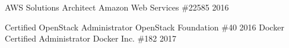 

\begin{cvhonors}

  \cvhonor
    {AWS Solutions Architect}
    {Amazon Web Services}
    {\#22585}
    {2016} %

  \cvhonor
    {Certified OpenStack Administrator}
    {OpenStack Foundation}
    {\#40}
    {2016} %
  \cvhonor
    {Docker Certified Administrator}
    {Docker Inc.}
    {\#182}
    {2017} %

\end{cvhonors}
